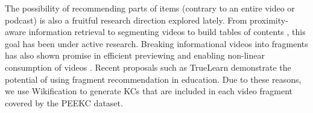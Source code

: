 \documentclass[letterpaper]{article} %
\begin{document}
The possibility of recommending parts of items (contrary to an entire video or podcast) is also a fruitful research direction explored lately. From proximity-aware information retrieval 
\cite{schenkel2007efficient} to segmenting videos to build tables of contents \cite{videoken}, this goal has been under active research. Breaking informational videos into fragments has also shown promise in efficient previewing \cite{chen2018temporally} and enabling non-linear consumption of videos \cite{non_lin}. Recent proposals such as TrueLearn \cite{truelearn} demonstrate the potential of using fragment recommendation in education. %
Due to these reasons, we use Wikification \cite{wikifier} to generate KCs that are included in each video fragment covered by the PEEKC dataset.




\end{document}

